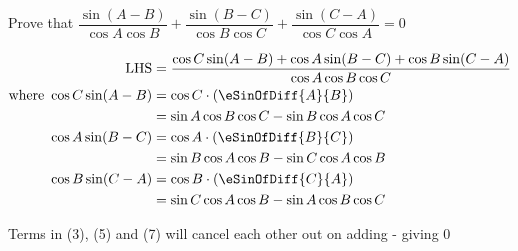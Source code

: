 

\question[2] Prove that $\dfrac{\sin(A-B)}{\cos A\cos B} + \dfrac{\sin(B-C)}{\cos B\cos C} 
+ \dfrac{\sin(C-A)}{\cos C\cos A} = 0$


\ifprintanswers
\fi 

\begin{solution}[\halfpage]
    \begin{align}
      \text{LHS} &= \dfrac{\cos C\sin(A-B) + \cos A\sin(B-C) + 
        \cos B\sin(C-A)}{\cos A\cos B\cos C} \\
      \text{where }\cos C\sin(A-B) &= \cos C\cdot(\eSinOfDiff{A}{B}) \\
           &= \sin A\cos B\cos C - \sin B\cos A\cos C \\
       \cos A\sin(B-C) &= \cos A\cdot(\eSinOfDiff{B}{C}) \\
          &= \sin B\cos A\cos B - \sin C\cos A\cos B \\
       \cos B\sin(C-A) &= \cos B\cdot(\eSinOfDiff{C}{A}) \\
          &= \sin C\cos A\cos B - \sin A\cos B\cos C
    \end{align}

    Terms in (3), (5) and (7) will cancel each other out on adding - giving $0$ 
\end{solution}
